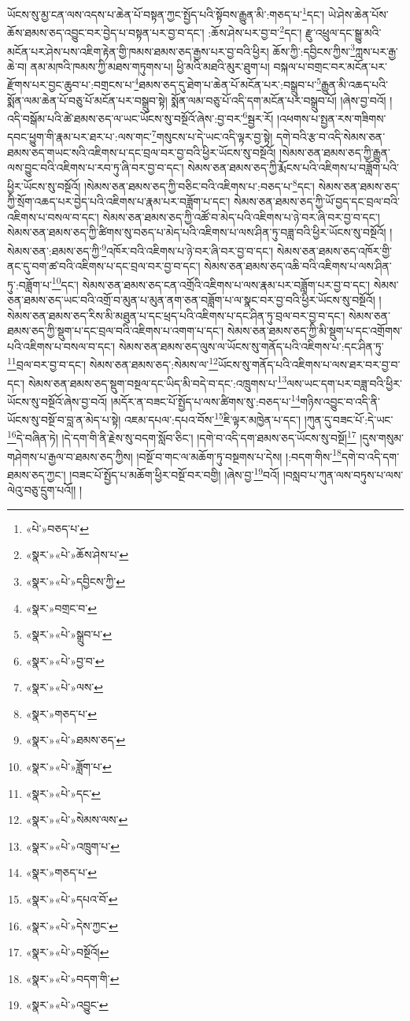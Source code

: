 ཡོངས་སུ་མྱ་ངན་ལས་འདས་པ་ཆེན་པོ་བསྟན་ཀྱང་སྤྱོད་པའི་སྟོབས་རྒྱུན་མི་:གཅད་པ་\footnote{«པེ་»བཅད་པ་}དང་། ཡེ་ཤེས་ཆེན་པོས་ཆོས་ཐམས་ཅད་འབྱུང་བར་བྱེད་པ་བསྟན་པར་བྱ་བ་དང་། :ཆོས་ཤེས་པར་བྱ་བ་\footnote{«སྣར་»«པེ་»ཆོས་ཤེས་པ་}དང་། རྫུ་འཕྲུལ་དང་སྒྱུ་མའི་མངོན་པར་ཤེས་པས་འཇིག་རྟེན་གྱི་ཁམས་ཐམས་ཅད་རྒྱས་པར་བྱ་བའི་ཕྱིར། ཆོས་ཀྱི་:དབྱིངས་ཀྱིས་\footnote{«སྣར་»«པེ་»དབྱིངས་ཀྱི་}ཀླས་པར་རྒྱ་ཆེ་བ། ནམ་མཁའི་ཁམས་ཀྱི་མཐས་གཏུགས་པ། ཕྱི་མའི་མཐའི་མུར་ཐུག་པ། བསྐལ་པ་བགྲང་བར་མངོན་པར་རྫོགས་པར་བྱང་ཆུབ་པ་:བགྲངས་པ་\footnote{«སྣར་»བགྲང་བ་}ཐམས་ཅད་དུ་ཐེག་པ་ཆེན་པོ་མངོན་པར་:བསྒྲུབ་པ་\footnote{«སྣར་»«པེ་»སྒྲུབ་པ་}རྒྱུན་མི་འཆད་པའི་སྨོན་ལམ་ཆེན་པོ་བཅུ་པོ་མངོན་པར་བསྒྲུབ་སྟེ། སྨོན་ལམ་བཅུ་པོ་འདི་དག་མངོན་པར་བསྒྲུབ་པོ། །ཞེས་བྱ་བའོ། །འདི་བསྒོམ་པའི་ཚེ་ཐམས་ཅད་ལ་ཡང་ཡོངས་སུ་བསྔོའོ་ཞེས་:བྱ་བར་\footnote{«སྣར་»«པེ་»བྱ་བ་}སྦྱར་རོ། །འཕགས་པ་སྤྱན་རས་གཟིགས་དབང་ཕྱུག་གི་རྣམ་པར་ཐར་པ་:ལས་གང་\footnote{«སྣར་»«པེ་»ལས་}གསུངས་པ་དེ་ཡང་འདི་ལྟར་བྱ་སྟེ། དགེ་བའི་རྩ་བ་འདི་སེམས་ཅན་ཐམས་ཅད་གཡང་སའི་འཇིགས་པ་དང་བྲལ་བར་བྱ་བའི་ཕྱིར་ཡོངས་སུ་བསྔོའོ། །སེམས་ཅན་ཐམས་ཅད་ཀྱི་རྒྱུན་ལས་བྱུང་བའི་འཇིགས་པ་རབ་ཏུ་ཞི་བར་བྱ་བ་དང་། སེམས་ཅན་ཐམས་ཅད་ཀྱི་རྨོངས་པའི་འཇིགས་པ་བཟློག་པའི་ཕྱིར་ཡོངས་སུ་བསྔོའོ། །སེམས་ཅན་ཐམས་ཅད་ཀྱི་བཅིང་བའི་འཇིགས་པ་:བཅད་པ་\footnote{«སྣར་»གཅད་པ་}དང་། སེམས་ཅན་ཐམས་ཅད་ཀྱི་སྲོག་འཆད་པར་བྱེད་པའི་འཇིགས་པ་རྣམ་པར་བཟློག་པ་དང་། སེམས་ཅན་ཐམས་ཅད་ཀྱི་ཡོ་བྱད་དང་བྲལ་བའི་འཇིགས་པ་བསལ་བ་དང་། སེམས་ཅན་ཐམས་ཅད་ཀྱི་འཚོ་བ་མེད་པའི་འཇིགས་པ་ཉེ་བར་ཞི་བར་བྱ་བ་དང་། སེམས་ཅན་ཐམས་ཅད་ཀྱི་ཚིགས་སུ་བཅད་པ་མེད་པའི་འཇིགས་པ་ལས་ཤིན་ཏུ་བཟླ་བའི་ཕྱིར་ཡོངས་སུ་བསྔོའོ། །སེམས་ཅན་:ཐམས་ཅད་ཀྱི་\footnote{«སྣར་»«པེ་»ཐམས་ཅད་}འཁོར་བའི་འཇིགས་པ་ཉེ་བར་ཞི་བར་བྱ་བ་དང་། སེམས་ཅན་ཐམས་ཅད་འཁོར་གྱི་ནང་དུ་བག་ཚ་བའི་འཇིགས་པ་དང་བྲལ་བར་བྱ་བ་དང་། སེམས་ཅན་ཐམས་ཅད་འཆི་བའི་འཇིགས་པ་ལས་ཤིན་ཏུ་:བཟློག་པ་\footnote{«སྣར་»«པེ་»ཟློག་པ་}དང་། སེམས་ཅན་ཐམས་ཅད་ངན་འགྲོའི་འཇིགས་པ་ལས་རྣམ་པར་བཟློག་པར་བྱ་བ་དང་། སེམས་ཅན་ཐམས་ཅད་ཡང་བའི་འགྲོ་བ་མུན་པ་མུན་ནག་ཅན་བཟློག་པ་ལ་སྣང་བར་བྱ་བའི་ཕྱིར་ཡོངས་སུ་བསྔོའོ། །སེམས་ཅན་ཐམས་ཅད་རིས་མི་མཐུན་པ་དང་ཕྲད་པའི་འཇིགས་པ་དང་ཤིན་ཏུ་བྲལ་བར་བྱ་བ་དང་། སེམས་ཅན་ཐམས་ཅད་ཀྱི་སྡུག་པ་དང་བྲལ་བའི་འཇིགས་པ་འགག་པ་དང་། སེམས་ཅན་ཐམས་ཅད་ཀྱི་མི་སྡུག་པ་དང་འགྲོགས་པའི་འཇིགས་པ་བསལ་བ་དང་། སེམས་ཅན་ཐམས་ཅད་ལུས་ལ་ཡོངས་སུ་གནོད་པའི་འཇིགས་པ་:དང་ཤིན་ཏུ་\footnote{«སྣར་»«པེ་»དང་}བྲལ་བར་བྱ་བ་དང་། སེམས་ཅན་ཐམས་ཅད་:སེམས་ལ་\footnote{«སྣར་»«པེ་»སེམས་ལས་}ཡོངས་སུ་གནོད་པའི་འཇིགས་པ་ལས་ཐར་བར་བྱ་བ་དང་། སེམས་ཅན་ཐམས་ཅད་སྡུག་བསྔལ་དང་ཡིད་མི་བདེ་བ་དང་:འཁྲུགས་པ་\footnote{«སྣར་»«པེ་»འཁྲུག་པ་}ལས་ཡང་དག་པར་བཟླ་བའི་ཕྱིར་ཡོངས་སུ་བསྔོའོ་ཞེས་བྱ་བའོ། །མདོར་ན་བཟང་པོ་སྤྱོད་པ་ལས་ཚིགས་སུ་:བཅད་པ་\footnote{«སྣར་»གཅད་པ་}གཉིས་འབྱུང་བ་འདི་ནི་ཡོངས་སུ་བསྔོ་བ་བླ་ན་མེད་པ་སྟེ། འཇམ་དཔལ་:དཔའ་བོས་\footnote{«སྣར་»«པེ་»དཔའ་བོ་}ཇི་ལྟར་མཁྱེན་པ་དང་། །ཀུན་དུ་བཟང་པོ་:དེ་ཡང་\footnote{«སྣར་»«པེ་»དེས་ཀྱང་}དེ་བཞིན་ཏེ། །དེ་དག་གི་ནི་རྗེས་སུ་བདག་སློབ་ཅིང་། །དགེ་བ་འདི་དག་ཐམས་ཅད་ཡོངས་སུ་བསྔོ།\footnote{«སྣར་»«པེ་»བསྔོའོ།} །དུས་གསུམ་གཤེགས་པ་རྒྱལ་བ་ཐམས་ཅད་ཀྱིས། །བསྔོ་བ་གང་ལ་མཆོག་ཏུ་བསྔགས་པ་དེས། །:བདག་གིས་\footnote{«སྣར་»«པེ་»བདག་གི་}དགེ་བ་འདི་དག་ཐམས་ཅད་ཀྱང་། །བཟང་པོ་སྤྱོད་པ་མཆོག་ཕྱིར་བསྔོ་བར་བགྱི། །ཞེས་བྱ་\footnote{«སྣར་»«པེ་»འབྱུང་}བའོ། །བསླབ་པ་ཀུན་ལས་བཏུས་པ་ལས་ལེའུ་བཅུ་དྲུག་པའོ།། །
